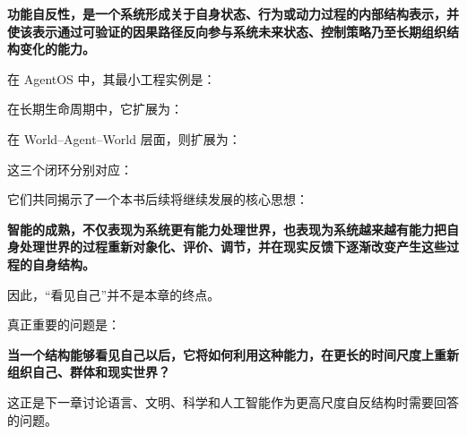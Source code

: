 \begin{definition*}
\bfseries
功能自反性，是一个系统形成关于自身状态、行为或动力过程的内部结构表示，并使该表示通过可验证的因果路径反向参与系统未来状态、控制策略乃至长期组织结构变化的能力。
\end{definition*}

在 AgentOS 中，其最小工程实例是：
\begin{statementbox}
\centering
{}
\end{statementbox}

在长期生命周期中，它扩展为：
\begin{statementbox}
\centering
{}
\end{statementbox}

在 World--Agent--World 层面，则扩展为：
\begin{statementbox}
\centering
{}
\end{statementbox}

这三个闭环分别对应：
\begin{statementbox}
\centering
{}
\end{statementbox}

它们共同揭示了一个本书后续将继续发展的核心思想：

\begin{statementbox}
\bfseries
智能的成熟，不仅表现为系统更有能力处理世界，也表现为系统越来越有能力把自身处理世界的过程重新对象化、评价、调节，并在现实反馈下逐渐改变产生这些过程的自身结构。
\end{statementbox}

因此，“看见自己”并不是本章的终点。

真正重要的问题是：

\begin{statementbox}
\bfseries
当一个结构能够看见自己以后，它将如何利用这种能力，在更长的时间尺度上重新组织自己、群体和现实世界？
\end{statementbox}

这正是下一章讨论语言、文明、科学和人工智能作为更高尺度自反结构时需要回答的问题。
